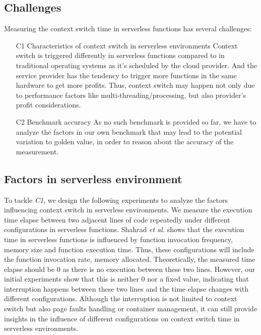 


\subsection{Challenges}
Measuring the context switch time in serverless functions has several challenges:
\begin{itemize}
	\item [C1] Characteristics of context switch in serverless environments
	Context switch is triggered differently in serverless functions compared to in traditional operating systems as it's scheduled by the cloud provider.
	And the service provider has the tendency to trigger more functions in the same hardware to get more profits. 
	Thus, context switch may happen not only due to performance factors like multi-threading/processing, but also provider's profit considerations.
	\item [C2] Benchmark accuracy
	As no such benchmark is provided so far, we have to analyze the factors in our own benchmark that may lead to the potential variation to golden value, 
	in order to reason about the accuracy of the measurement.
\end{itemize}

\subsection{Factors in serverless environment}
	To tackle \emph{C1}, we design the following experiments to analyze the factors influencing context switch in serverless environments.
	We measure the execution time elapse between two adjacent lines of code repeatedly under different configurations in serverless functions.
	Shahrad \emph{et al.} \cite{serverless-main} shows that the execution time in serverless functions is influenced by function invocation frequency, memory size and function execution time.
	Thus, these configurations will include the function invocation rate, memory allocated.
	Theoretically, the measured time elapse should be 0 as there is no execution between these two lines. 
	However, our initial experiments show that this is neither 0 nor a fixed value, indicating that interruption happens between these two lines
	and the time elapse changes with different configurations. 
	Although the interruption is not limited to context switch but also page faults handling or container management, 
	it can still provide insights in the influence of different configurations on context switch time in serverless environments.


